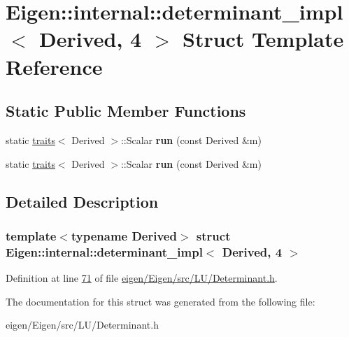 \hypertarget{struct_eigen_1_1internal_1_1determinant__impl_3_01_derived_00_014_01_4}{}\section{Eigen\+:\+:internal\+:\+:determinant\+\_\+impl$<$ Derived, 4 $>$ Struct Template Reference}
\label{struct_eigen_1_1internal_1_1determinant__impl_3_01_derived_00_014_01_4}
\subsection*{Static Public Member Functions}
\begin{DoxyCompactItemize}
\item 
\mbox{\label{struct_eigen_1_1internal_1_1determinant__impl_3_01_derived_00_014_01_4_adb5a6a0cdda4664a8dd38c348411ee03}} 
static \hyperlink{struct_eigen_1_1internal_1_1traits}{traits}$<$ Derived $>$\+::Scalar {\bfseries run} (const Derived \&m)
\item 
\mbox{\label{struct_eigen_1_1internal_1_1determinant__impl_3_01_derived_00_014_01_4_adb5a6a0cdda4664a8dd38c348411ee03}} 
static \hyperlink{struct_eigen_1_1internal_1_1traits}{traits}$<$ Derived $>$\+::Scalar {\bfseries run} (const Derived \&m)
\end{DoxyCompactItemize}


\subsection{Detailed Description}
\subsubsection*{template$<$typename Derived$>$\newline
struct Eigen\+::internal\+::determinant\+\_\+impl$<$ Derived, 4 $>$}



Definition at line \hyperlink{eigen_2_eigen_2src_2_l_u_2_determinant_8h_source_l00071}{71} of file \hyperlink{eigen_2_eigen_2src_2_l_u_2_determinant_8h_source}{eigen/\+Eigen/src/\+L\+U/\+Determinant.\+h}.



The documentation for this struct was generated from the following file\+:\begin{DoxyCompactItemize}
\item 
eigen/\+Eigen/src/\+L\+U/\+Determinant.\+h\end{DoxyCompactItemize}
